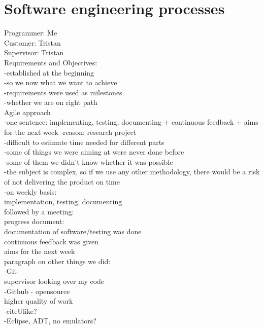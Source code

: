 \section{Software engineering processes}
\label{s:processes}
Programmer: Me\\	
Customer: Tristan\\
Supervisor: Tristan\\

Requirements and Objectives:\\
	-established at the beginning\\
		-so we now what we want to achieve\\
	-requirements were used as milestones\\
		-whether we are on right path\\

Agile approach\\
	-one sentence: implementing, testing, documenting + continuous feedback + aims for the next week
	-reason: research project\\
		-difficult to estimate time needed for different parts\\
			-some of things we were aiming at were never done before\\
			-some of them we didn't know whether it was possible\\
		-the subject is complex, so if we use any other methodology, there would be a risk of not delivering the product on time\\
			
	-on weekly basis:\\
		implementation, testing, documenting\\
		followed by a meeting:\\
			progress document:\\
				documentation of software/testing was done\\
			continuous feedback was given\\
			aims for the next week\\
			
paragraph on other things we did:\\
	-Git\\
		supervisor looking over my code\\
	-Github - opensource\\
		higher quality of work\\
	-citeUlike?\\
	-Eclipse, ADT, no emulators?\\
	